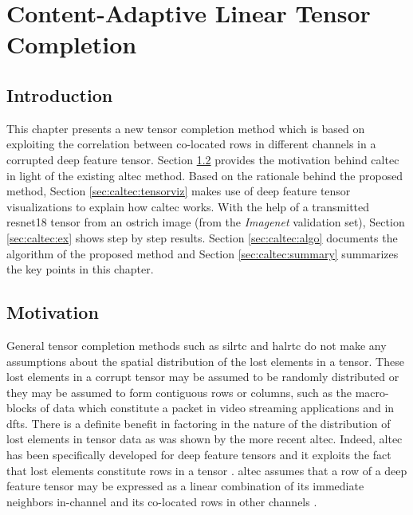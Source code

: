 \chapter{Content-Adaptive Linear Tensor Completion} \label{chapter:caltec}

\section{Introduction} \label{sec:caltec:intro}
This chapter presents a new tensor completion method which is based on exploiting the correlation between co-located rows in different channels in a corrupted deep feature tensor. Section \ref{sec:caltec:motivation} provides the motivation behind \gls{caltec} in light of the existing \gls{altec} method. Based on the rationale behind the proposed method, Section \ref{sec:caltec:tensorviz} makes use of deep feature tensor visualizations to explain how \gls{caltec} works. With the help of a transmitted \gls{resnet18} tensor from an ostrich image (from the \textit{Imagenet} validation set), Section \ref{sec:caltec:ex} shows step by step results. Section \ref{sec:caltec:algo} documents the algorithm of the proposed method and Section \ref{sec:caltec:summary} summarizes the key points in this chapter.

\section{Motivation} \label{sec:caltec:motivation}
General tensor completion methods such as \gls{silrtc} and \gls{halrtc} do not make any assumptions about the spatial distribution of the lost elements in a tensor. These lost elements in a corrupt tensor may be assumed to be randomly distributed or they may be assumed to form contiguous rows or columns, such as the macro-blocks of data which constitute a packet in video streaming applications and in \gls{dfts}. There is a definite benefit in factoring in the nature of the distribution of lost elements in tensor data as was shown by the more recent \gls{altec}. Indeed, \gls{altec} has been specifically developed for deep feature tensors and it exploits the fact that lost elements constitute rows in a tensor \cite{9017944}. \gls{altec} assumes that a row of a deep feature tensor may be expressed as a linear combination of its immediate neighbors in-channel and its co-located rows in other channels \cite{9017944}.

